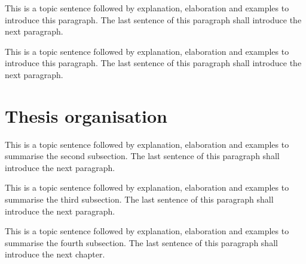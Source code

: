 This is a topic sentence followed by explanation, elaboration and examples to introduce this paragraph. The last sentence of this paragraph shall introduce the next paragraph. \lipsum[1]

This is a topic sentence followed by explanation, elaboration and examples to introduce this paragraph. The last sentence of this paragraph shall introduce the next paragraph. \lipsum[1]

\section{Thesis organisation}
\label{sec:ch_1_conclusion}


This is a topic sentence followed by explanation, elaboration and examples to summarise the second subsection. The last sentence of this paragraph shall introduce the next paragraph. \lipsum[1]

This is a topic sentence followed by explanation, elaboration and examples to summarise the third subsection. The last sentence of this paragraph shall introduce the next paragraph. \lipsum[1]

This is a topic sentence followed by explanation, elaboration and examples to summarise the fourth subsection. The last sentence of this paragraph shall introduce the next chapter. \lipsum[1]







